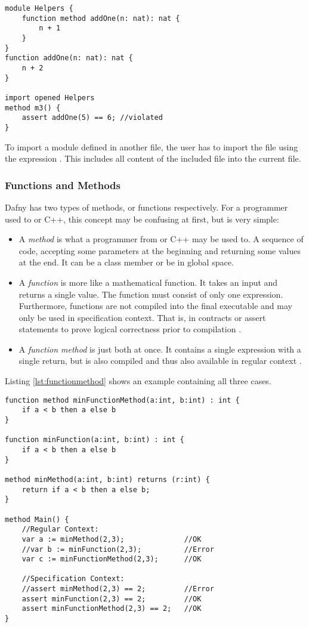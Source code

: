 \begin{lstlisting}[language = dafny, caption={Naming Clash}, captionpos=b, label={lst:moduleShadowing}]
module Helpers {
    function method addOne(n: nat): nat {
        n + 1
    }
}
function addOne(n: nat): nat {
    n + 2
}

import opened Helpers
method m3() {
    assert addOne(5) == 6; //violated
}
\end{lstlisting}

To import a module defined in another file, the user has to import the file using the expression .
This includes all content of the included file into the current file.

\subsubsection{Functions and Methods}
Dafny has two types of methods, or functions respectively.
For a programmer used to \CsharpWithSpace or C++, this concept may be confusing at first, but is very simple:
\begin{itemize}
\item A \textit{method} is what a programmer from \CsharpWithSpace or C++ may be used to.
A sequence of code, accepting some parameters at the beginning and returning some values at the end.
It can be a class member or be in global space.
\item A \textit{function} is more like a mathematical function.
It takes an input and returns a single value.
The function must consist of only one expression.
Furthermore, functions are not compiled into the final executable and may only be used in specification context.
That is, in contracts or assert statements to prove logical correctness prior to compilation \cite{functionVSMethod}.
\item A \textit{function method} is just both at once.
It contains a single expression with a single return, but is also compiled and thus also available in regular context \cite{functionVSMethod}.
\end{itemize}

Listing \ref{lst:functionmethod} shows an example containing all three cases.

\pagebreak

\begin{lstlisting}[language=dafny, caption={Function and Method Difference}, captionpos=b, label={lst:functionmethod}]
function method minFunctionMethod(a:int, b:int) : int {
    if a < b then a else b
}

function minFunction(a:int, b:int) : int {
    if a < b then a else b
}

method minMethod(a:int, b:int) returns (r:int) {
    return if a < b then a else b;
}

method Main() {
    //Regular Context:
    var a := minMethod(2,3);              //OK
    //var b := minFunction(2,3);          //Error
    var c := minFunctionMethod(2,3);      //OK

    //Specification Context:
    //assert minMethod(2,3) == 2;         //Error
    assert minFunction(2,3) == 2;         //OK
    assert minFunctionMethod(2,3) == 2;   //OK
}
\end{lstlisting}

